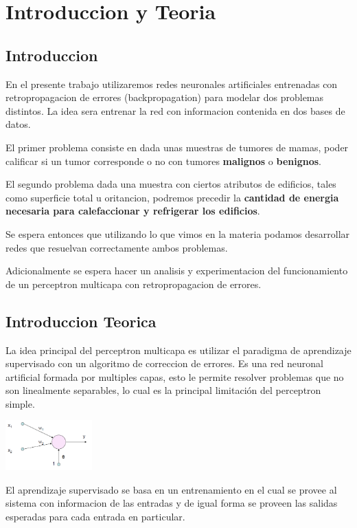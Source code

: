 \section{Introduccion y Teoria}
\subsection{Introduccion}
En el presente trabajo utilizaremos redes neuronales artificiales entrenadas con retropropagacion de errores (backpropagation) para modelar dos problemas distintos. La idea sera entrenar la red con informacion contenida en dos bases de datos.

El primer problema consiste en dada unas muestras de tumores de mamas, poder calificar si un tumor corresponde o no con tumores \textbf{malignos} o \textbf{benignos}.

El segundo problema dada una muestra con ciertos atributos de edificios, tales como superficie total u oritancion, podremos precedir la \textbf{cantidad de energia necesaria para calefaccionar y refrigerar los edificios}.

Se espera entonces que utilizando lo que vimos en la materia podamos desarrollar redes que resuelvan correctamente ambos problemas. 

Adicionalmente se espera hacer un analisis y experimentacion del funcionamiento de un perceptron multicapa con retropropagacion de errores.

\subsection{Introduccion Teorica}
La idea principal del perceptron multicapa es utilizar el paradigma de aprendizaje supervisado con un algoritmo de correccion de errores. Es una red neuronal artificial formada por multiples capas, esto le permite resolver problemas que no son linealmente separables, lo cual es la principal limitación del perceptron simple.

\begin{center}
\includegraphics[width=0.25\textwidth]{img/psimple}
\end{center}

El aprendizaje supervisado se basa en un entrenamiento en el cual se provee al sistema con informacion de las entradas y de igual forma se proveen las salidas esperadas para cada entrada en particular.

